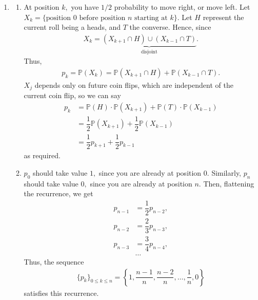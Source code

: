 \documentclass[12pt]{article}
\begin{document}
\begin{enumerate}
  \item
    \begin{enumerate}
      \item At position $k,$ you have $1/2$ probability to move
        right, or move left. Let $X_k = \{\text{position $0$ before
        position $n$ starting at $k$}\}.$ Let $H$ represent the
        current roll being a heads, and $T$ the converse. Hence, since
        \begin{align*}
          X_k = \underbrace{(X_{k + 1} \cap H) \cup (X_{k -1 } \cap
          T)}_{\text{disjoint}}.
        \end{align*}
        Thus,
        \begin{align*}
          p_k = \mathbb P(X_k) = \mathbb P(X_{k + 1} \cap H) +
          \mathbb P(X_{k-1} \cap T).
        \end{align*}
        $X_j$ depends only on future coin flips, which are
        independent of the current coin flip, so we can say
        \begin{align*}
          p_k &= \mathbb P(H) \cdot \mathbb P(X_{k + 1}) + \mathbb
          P(T) \cdot \mathbb P(X_{k -1}) \\
          &= \dfrac{1}{2} \mathbb P(X_{k + 1}) + \dfrac{1}{2} \mathbb
          P(X_{k -1}) \\
          &= \dfrac{1}{2} p_{k + 1} + \dfrac{1}{2} p_{k -1 }
        \end{align*}
        as required.

      \item $p_0$ should take value $1,$ since you are already at
        position $0.$ Similarly, $p_n$ should take value $0,$ since
        you are already at position $n.$ Then, flattening the
        recurrence, we get
        \begin{align*}
          p_{n - 1}  &= \dfrac{1}{2}p_{n - 2}, \\
          p_{n - 2}  &= \dfrac{2}{3}p_{n - 3}, \\
          p_{n - 3} &= \dfrac{3}{4} p_{n - 4},  \\
          &\ldots
        \end{align*}
        Thus, the sequence
        \begin{align*}
          \{p_k\}_{0 \leq k \leq n} = \left\{1, \dfrac{n - 1}{n},
          \dfrac{n -2}{n}, \ldots, \dfrac{1}{n}, 0\right\}
        \end{align*}
        satisfies this recurrence.
    \end{enumerate}


\end{enumerate}
\end{document}
